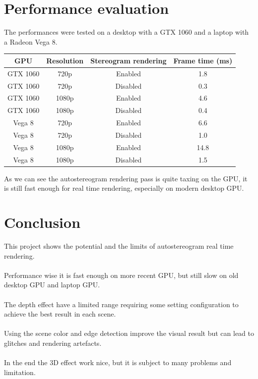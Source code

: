 \documentclass[12pt, a4paper]{article}
\begin{document}
\section{Performance evaluation}
The performances were tested on a desktop with a GTX 1060 and a laptop with a Radeon Vega 8.
\begin{center}
    \begin{tabular}{||c c c c||} 
     \hline
     GPU & Resolution & Stereogram rendering & Frame time (ms) \\
     \hline\hline
     GTX 1060 & 720p & Enabled & 1.8 \\ 
     \hline
     GTX 1060 & 720p & Disabled & 0.3 \\ 
     \hline
     GTX 1060 & 1080p & Enabled & 4.6 \\ 
     \hline
     GTX 1060 & 1080p & Disabled & 0.4 \\ 
     \hline
     Vega 8 & 720p & Enabled & 6.6 \\ 
     \hline
     Vega 8 & 720p & Disabled & 1.0 \\ 
     \hline
     Vega 8 & 1080p & Enabled & 14.8 \\ 
     \hline
     Vega 8 & 1080p & Disabled & 1.5 \\ 
     \hline    
    \end{tabular}
\end{center}
As we can see the autostereogram rendering pass is quite taxing on the GPU, it is still
fast enough for real time rendering, especially on modern desktop GPU. 

\section{Conclusion}
This project shows the potential and the limits of autostereogram real time rendering.\\\\
Performance wise it is fast enough on more recent GPU, but still slow on old desktop GPU and laptop GPU.\\\\
The depth effect have a limited range requiring some setting configuration to achieve the best result in each scene.\\\\
Using the scene color and edge detection improve the visual result but can lead to glitches and rendering artefacts.\\\\
In the end the 3D effect work nice, but it is subject to many problems and limitation.
\end{document}
